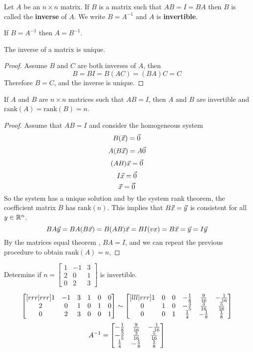 \documentclass[english, 12pt]{article}
\begin{document}
\begin{defn}
Let $A$ be an $n \times n$ matrix. If $B$ is a matrix such that $AB = I = BA$ then $B$ is called the \textbf{inverse} of $A$. We write $B = A^{-1}$ and $A$ is \textbf{invertible}.
\end{defn}

\begin{note}
If $B = A^{-1}$ then $A = B^{-1}$.
\end{note}

\begin{thrm}
The inverse of a matrix is unique.
\begin{proof}
Assume $B$ and $C$ are both inverses of $A$, then
\[B = BI = B(AC) = (BA)C = C\]
Therefore $B = C$, and the inverse is unique.
\end{proof}
\end{thrm}

\begin{thrm}
If $A$ and $B$ are $n \times n$ matrices such that $AB = I$, then $A$ and $B$ are invertible and $\text{rank}(A) = \text{rank}(B) = n$.
\begin{proof}
Assume that $AB=I$ and consider the homogeneous system
\[B(\vec{x}) = \vec{0}\]
\[A(B\vec{x}) = A\vec{0}\]
\[(AB)\vec{x} = \vec{0}\]
\[I\vec{x} = \vec{0}\]
\[\vec{x} = \vec{0}\]
So the system has a unique solution and by the system rank theorem, the coefficient matrix $B$ has $\text{rank}(n)$. This implies that $B\vec{x} = \vec{y}$ is consistent for all $y \in {\mathbb{R}}^n$.
\[BA\vec{y} = BA(B\vec{x}) = B(AB)\vec{x} = BI(vx) = B\vec{x} = \vec{y} = I\vec{y}\]
By the matrices equal theorem , $BA = I$, and we can repeat the previous procedure to obtain $\text{rank}(A) = n$,
\end{proof}
\end{thrm}

\begin{exmp}
Determine if $n = \begin{bmatrix} 1 & -1 & 3 \\ 2 & 0 & 1 \\ 0 & 2 & 3 \end{bmatrix}$ is invertible.
\begin{sol}
\[\begin{bmatrix}[rrr|rrr] 1 & -1 & 3 & 1 & 0 & 0\\ 2 & 0 & 1 & 0 & 1 & 0\\ 0 & 2 & 3 & 0 & 0 & 1\end{bmatrix} \sim \begin{bmatrix}[lll|rrr] 1 & 0 & 0 & -\frac{1}{8} & \frac{9}{16} & -\frac{1}{16} \\ 0 & 1 & 0 & -\frac{3}{5} & \frac{3}{16} & \frac{5}{16} \\ 0 & 0 & 1 & \frac{1}{4} & - \frac{1}{8} & \frac{1}{8}\end{bmatrix}\]
\[A^{-1} = \begin{bmatrix} -\frac{1}{8} & \frac{9}{16} & -\frac{1}{16} \\ -\frac{3}{5} & \frac{3}{16} & \frac{5}{16} \\ \frac{1}{4} & - \frac{1}{8} & \frac{1}{8}\end{bmatrix}\]
\end{sol}
\end{exmp}
\end{document}
